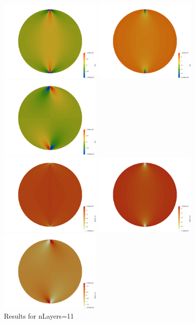 \begin{center}
\includegraphics[width=5cm]{python_codes/fieldstone_58/results/111/exx}
\includegraphics[width=5cm]{python_codes/fieldstone_58/results/111/eyy}
\includegraphics[width=5cm]{python_codes/fieldstone_58/results/111/exy}\\
\includegraphics[width=5cm]{python_codes/fieldstone_58/results/111/sigma_xx}
\includegraphics[width=5cm]{python_codes/fieldstone_58/results/111/sigma_yy}
\includegraphics[width=5cm]{python_codes/fieldstone_58/results/111/sigma_xy}\\
{\captionfont Results for nLayers=11}
\end{center}

